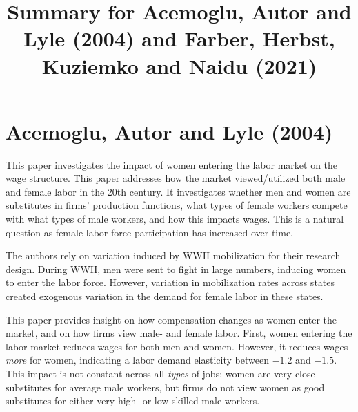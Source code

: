\documentclass[dvipsnames]{article}
\title{Summary for Acemoglu, Autor and Lyle (2004) and Farber, Herbst, Kuziemko and Naidu (2021)}
\begin{document}
\maketitle
\section{Acemoglu, Autor and Lyle (2004)}
This paper investigates the impact of women entering the labor market on the wage structure. 
This paper addresses how the market viewed/utilized both male and female labor in the 20th century. It investigates whether men and women are substitutes in firms' production functions, what types of female workers compete with what types of male workers, and how this impacts wages. This is a natural question as female labor force participation has increased over time.

The authors rely on variation induced by WWII mobilization for their research design. During WWII, men were sent to fight in large numbers, inducing women to enter the labor force. However, variation in mobilization rates across states created exogenous variation in the demand for female labor in these states. 


This paper provides insight on how compensation changes as women enter the market, and on how firms view male- and female labor. First, women entering the labor market reduces wages for both men and women. However, it reduces wages \emph{more} for women, indicating a labor demand elasticity between $-1.2$ and $-1.5$. This impact is not constant across all \emph{types} of jobs: women are very close substitutes for average male workers, but firms do not view women as good substitutes for either very high- or low-skilled male workers.
\end{document}
